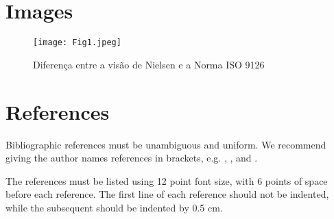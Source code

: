 \documentclass[12pt]{article}
\begin{document}


\section{Images}

\begin{figure}[ht]
\centering
\texttt{[image: Fig1.jpeg]}
\caption{Diferença entre a visão de Nielsen e a Norma ISO 9126}
\end{figure}

\begin{figure}[ht]
\centering

\end{figure}



\begin{table}[ht]
\centering

\end{table}





\section{References}

Bibliographic references must be unambiguous and uniform.  We recommend giving
the author names references in brackets, e.g. \cite{knuth:84},
\cite{boulic:91}, and \cite{smith:99}.

The references must be listed using 12 point font size, with 6 points of space
before each reference. The first line of each reference should not be
indented, while the subsequent should be indented by 0.5 cm.



\end{document}
